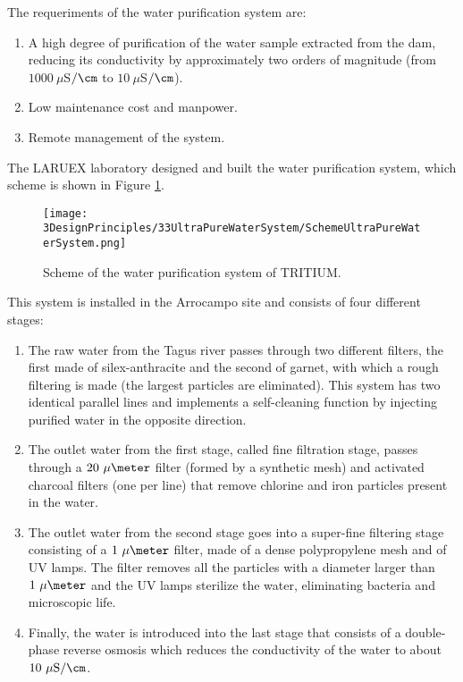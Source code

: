 The requeriments of the water purification system are:

\begin{enumerate}

\item{} A high degree of purification of the water sample extracted from the dam, reducing its conductivity by approximately two orders of magnitude (from $1000~\mu$S$/\cm$ to $10~\mu$S$/\cm$).

\item{} Low maintenance cost  and manpower.

\item{} Remote management of the system.
\end{enumerate}

The LARUEX laboratory designed and built the water purification system, which scheme is shown in Figure \ref{fig:WPSScheme}.

\begin{figure}[htbp]
\centering
\texttt{[image: 3DesignPrinciples/33UltraPureWaterSystem/SchemeUltraPureWaterSystem.png]}
\caption{Scheme of the water purification system of TRITIUM.\label{fig:WPSScheme}}
\end{figure}
This system is installed in the Arrocampo site and consists of four different stages:

\begin{enumerate}
\item{} The raw water from the Tagus river passes through two different filters, the first made of silex-anthracite and the second of garnet, with which a rough filtering is made (the largest particles are eliminated). This system has two identical parallel lines and implements a self-cleaning function by injecting purified water in the opposite direction.

\item{} The outlet water from the first stage, called fine filtration stage, passes through a $20~\mu\meter$ filter (formed by a synthetic mesh) and activated charcoal filters (one per line) that remove chlorine and iron particles present in the water.

\item{} The outlet water from the second stage goes into a super-fine filtering stage consisting of a $1~\mu\meter$ filter, made of a dense polypropylene mesh and of UV lamps. The filter removes all the particles with a diameter larger than $1~\mu\meter$ and the UV lamps sterilize the water, eliminating bacteria and microscopic life.

\item{} Finally, the water is introduced into the last stage that consists of a double-phase reverse osmosis which  reduces the conductivity of the water to about $10~\mu\mathrm{S}/\cm$. 

\end{enumerate}

